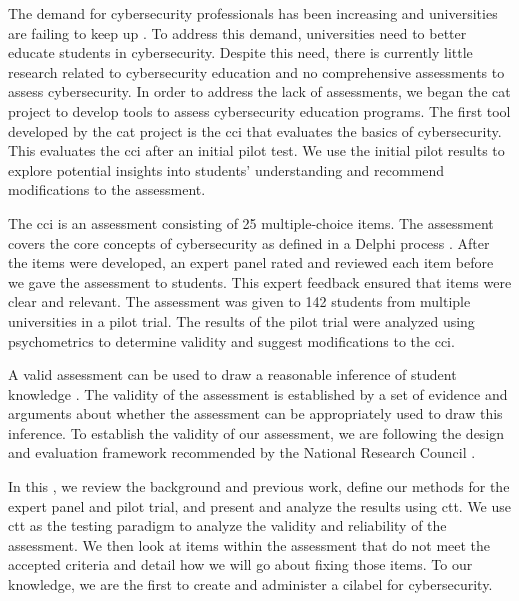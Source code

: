The demand for cybersecurity professionals has been increasing and universities are failing to keep up \cite{workforce, hackers_wanted}. To address this demand, universities need to better educate students in cybersecurity. Despite this need, there is currently little research related to cybersecurity education and no comprehensive assessments to assess cybersecurity. In order to address the lack of assessments, we began the \gls{cat} project to develop tools to assess cybersecurity education programs. The first tool developed by the \gls{cat} project is the \gls{cci} that evaluates the basics of cybersecurity. This \DocTitle evaluates the \gls{cci} after an initial pilot test. We use the initial pilot results to explore potential insights into students' understanding and recommend modifications to the assessment. 

The \gls{cci} is an assessment consisting of 25 multiple-choice items. The assessment covers the core concepts of cybersecurity as defined in a Delphi process \cite{delphi}. After the items were developed, an expert panel rated and reviewed each item before we gave the assessment to students. This expert feedback ensured that items were clear and relevant. The assessment was given to 142 students from multiple universities in a pilot trial. The results of the pilot trial were analyzed using psychometrics to determine validity and suggest modifications to the \gls{cci}. 

A valid assessment can be used to draw a reasonable inference of student knowledge \cite{douglas_purzer}. The validity of the assessment is established by a set of evidence and arguments about whether the assessment can be appropriately used to draw this inference. To establish the validity of our assessment, we are following the design and evaluation framework recommended by the National Research Council \cite{libarkin,knowing_what_students_know}.


In this \NoSpaceDocTitle, we review the background and previous work, define our methods for the expert panel and pilot trial, and present and analyze the results using \gls{ctt}. We use \gls{ctt} as the testing paradigm to analyze the validity and reliability of the assessment. We then look at items within the assessment that do not meet the accepted criteria and detail how we will go about fixing those items. To our knowledge, we are the first to create and administer a \gls{cilabel} for cybersecurity. 